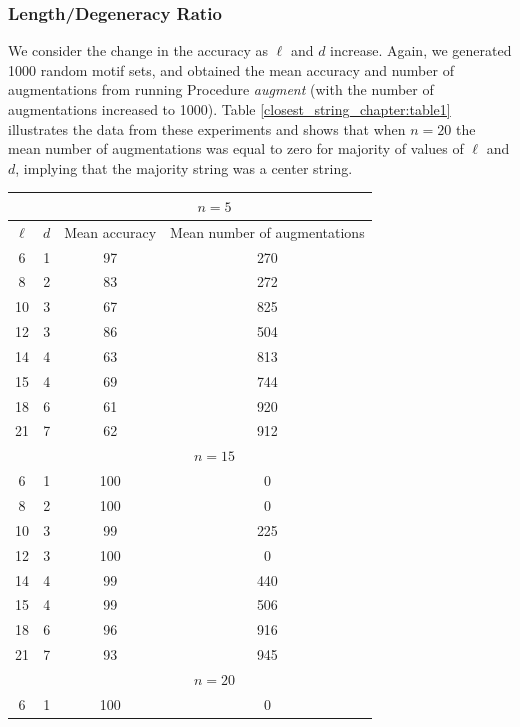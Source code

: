 \subsubsection{Length/Degeneracy Ratio}

We consider the change in the accuracy as $\ell$ and $d$ increase.  Again, we generated 1000 random motif sets, and obtained the mean accuracy and number of augmentations from running Procedure {\em augment} (with the number of augmentations increased to 1000).  Table \ref{closest_string_chapter:table1} illustrates the data from these experiments and shows that when $n = 20$ the mean number of augmentations was equal to zero for majority of values of $\ell$ and $d$, implying that the majority string was a center string.

\begin{table}[h!]
\begin{center}{ 
\begin{tabular}{|cc||c|c|}
\hline
 		&  			& \multicolumn{2}{c|}{$n = 5$} \\
\hline
$\ell$ 		& $d$ 		& Mean accuracy 		& Mean number of augmentations\\
\hline
\hline
   6			& 1			& 97 			& 270 			 \\
	8  		& 2			& 83 			& 272	 		\\
	10		& 3 			& 67 			& 825 			\\
	12		& 3			& 86 			& 504 			\\	
	14		& 4			& 63 			& 813 		 \\
	15		& 4			& 69 			& 744 		 \\
	18		&	6			& 61 			& 920 		 \\
	21		& 7			& 62 			& 912 		 \\
\hline
		&			& \multicolumn{2}{c|}{$n = 15$}  \\
\hline
   6			& 1			& 100 			& 0				 \\
	8  		& 2			& 100 			& 0 				 \\
	10		& 3 			& 99			& 225	 				\\
	12		& 3			& 100 			& 0 				 \\	
	14		& 4			& 99 			& 440	 		\\
	15		& 4			& 99  			& 506	 \\
	18		&	6			& 96 			& 916	 \\			
	21		& 7			& 93 			& 945	 \\
\hline
&& \multicolumn{2}{c|}{$n = 20$} \\
\hline
   6			& 1				& 100  		& 0 \\

\end{tabular}}
\end{center}
\end{table}
